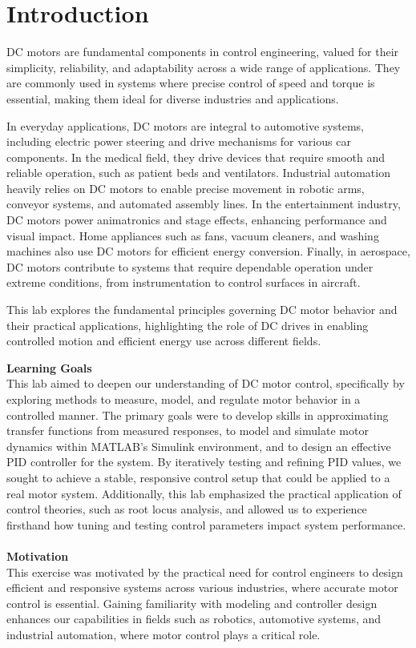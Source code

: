 \section{Introduction}
DC motors are fundamental components in control engineering, valued for their simplicity, 
reliability, and adaptability across a wide range of applications. They are commonly used in 
systems where precise control of speed and torque is essential, making them ideal for diverse 
industries and applications.

In everyday applications, DC motors are integral to automotive systems, including electric 
power steering and drive mechanisms for various car components. In the medical field, they 
drive devices that require smooth and reliable operation, such as patient beds and ventilators. 
Industrial automation heavily relies on DC motors to enable precise movement in robotic arms, 
conveyor systems, and automated assembly lines. In the entertainment industry, DC motors power 
animatronics and stage effects, enhancing performance and visual impact. Home appliances such as 
fans, vacuum cleaners, and washing machines also use DC motors for efficient energy conversion. 
Finally, in aerospace, DC motors contribute to systems that require dependable operation under 
extreme conditions, from instrumentation to control surfaces in aircraft.

This lab explores the fundamental principles governing DC motor behavior and their practical 
applications, highlighting the role of DC drives in enabling controlled motion and efficient 
energy use across different fields.

\textbf{Learning Goals}\\
This lab aimed to deepen our understanding of DC motor control, specifically by exploring methods to 
measure, model, and regulate motor behavior in a controlled manner. The primary goals were to develop 
skills in approximating transfer functions from measured responses, to model and simulate motor dynamics 
within MATLAB’s Simulink environment, and to design an effective PID controller for the system. 
By iteratively testing and refining PID values, we sought to achieve a stable, responsive control 
setup that could be applied to a real motor system. Additionally, this lab emphasized the practical 
application of control theories, such as root locus analysis, and allowed us to experience firsthand 
how tuning and testing control parameters impact system performance.\\
\\
\textbf{Motivation}\\
This exercise was motivated by the practical need for control engineers to design efficient and responsive 
systems across various industries, where accurate motor control is essential. Gaining familiarity with modeling 
and controller design enhances our capabilities in fields such as robotics, automotive systems, and industrial 
automation, where motor control plays a critical role.
\newpage
